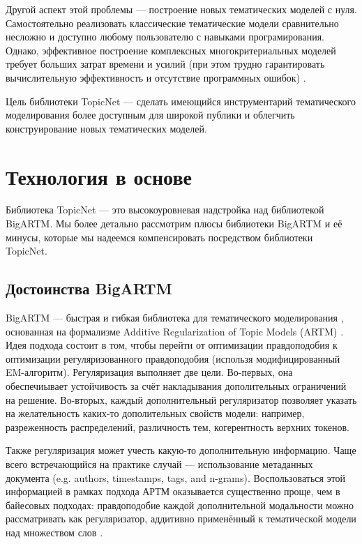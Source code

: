Другой аспект этой проблемы --- построение новых тематических моделей с нуля. Самостоятельно реализовать классические тематические модели сравнительно несложно и доступно любому пользователю с навыками програмирования. Однако, эффективное построение комплексных многокритериальных моделей требует больших затрат времени и усилий (при этом трудно гарантировать вычислительную эффективность и отсутствие программных ошибок) \cite{jiang2018familia}.

Цель библиотеки TopicNet --- сделать имеющийся инструментарий тематического моделирования более доступным для широкой публики и облегчить конструирование новых тематических моделей.


\section{Технология в основе}

Библиотека TopicNet --- это высокоуровневая надстройка над библиотекой BigARTM. Мы более детально рассмотрим плюсы библиотеки \mbox{BigARTM} и её минусы, которые мы надеемся компенсировать посредством библиотеки TopicNet.

\subsection{Достоинства BigARTM}


BigARTM --- быстрая и гибкая библиотека для тематического моделирования \cite{frei2016parallel}, основанная на формализме Additive Regularization of Topic Models (ARTM) \cite{voron14dan-eng}. Идея подхода состоит в том, чтобы перейти от оптимизации правдоподобия к оптимизации регуляризованного правдоподобия (использя модифицированный EM-алгоритм). 
Регуляризация выполняет две цели. Во-первых, она обеспечиывает устойчивость за счёт накладывания дополительных ограничений на решение. Во-вторых, каждый дополнительный регуляризатор позволяет указать на желательность каких-то дополительных свойств модели: например, разреженность распределений, различность тем, когерентность верхних токенов. 

Также регуляризация может учесть какую-то дополнительную информацию. Чаще всего встречающийся на практике случай --- использование метаданных документа (e.g. authors, timestamps, tags, and n-grams). Воспользоваться этой информацией в рамках подхода АРТМ оказывается существенно проще, чем в байесовых подходах: правдоподобие каждой дополнительной модальности можно рассматривать как регуляризатор, аддитивно применённый к тематической модели над множеством слов \cite{voron15nonbayesian}.

